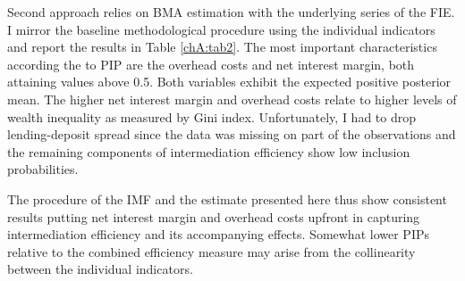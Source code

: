 \begin{enumerate}[resume]
    Second approach relies on \ac{BMA} estimation with the underlying series of the FIE. I mirror the baseline methodological procedure using the individual indicators and report the results in Table \ref{chA:tab2}. The most important characteristics according the to \ac{PIP} are the overhead costs and net interest margin, both attaining values above 0.5. Both variables exhibit the expected positive posterior mean. The higher net interest margin and overhead costs relate to higher levels of wealth inequality as measured by Gini index. Unfortunately, I had to drop lending-deposit spread since the data was missing on part of the observations and the remaining components of intermediation efficiency show low inclusion probabilities.

    The procedure of the IMF and the estimate presented here thus show consistent results putting net interest margin and overhead costs upfront in capturing intermediation efficiency and its accompanying effects. Somewhat lower \acp{PIP} relative to the combined efficiency measure may arise from the collinearity between the individual indicators.
    

\end{enumerate}
